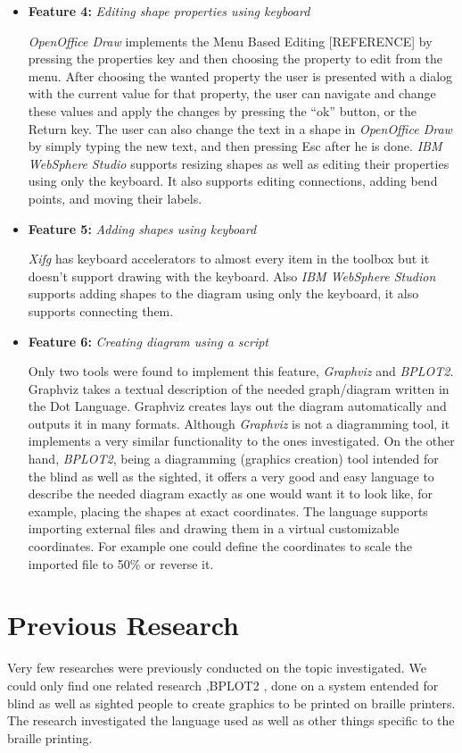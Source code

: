 \begin{itemize}
\item {\bf Feature 4:} {\em Editing shape properties using keyboard}
\par \noindent
{\em OpenOffice Draw} implements the Menu Based Editing [REFERENCE] by pressing the properties key and then choosing the property to edit from the menu. After choosing the wanted property the user is presented with a dialog with the current value for that property, the user can navigate and change these values and apply the changes by pressing the ``ok'' button, or the Return key. The user can also change the text in a shape in {\em OpenOffice Draw} by simply typing the new text, and then pressing Esc after he is done. {\em IBM WebSphere Studio} supports resizing shapes as well as editing their properties using only the keyboard. It also supports editing connections, adding bend points, and moving their labels.


\item {\bf Feature 5:} {\em Adding shapes using keyboard}
\par \noindent
{\em Xifg} has keyboard accelerators to almost every item in the toolbox but it doesn't support drawing with the keyboard. Also {\em IBM WebSphere Studion} supports adding shapes to the diagram using only the keyboard, it also supports connecting them.

\item {\bf Feature 6:} {\em Creating diagram using a script}
\par \noindent
Only two tools were found to implement this feature, {\em Graphviz} and {\em BPLOT2}. Graphviz takes a textual description of the needed graph/diagram written in the Dot Language\cite{dot_lang}. Graphviz creates lays out the diagram automatically and outputs it in many formats. Although {\em Graphviz} is not a diagramming tool, it implements a very similar functionality to the ones investigated. On the other hand, {\em BPLOT2}, being a diagramming (graphics creation) tool intended for the blind as well as the sighted, it offers a very good and easy language to describe the needed diagram exactly as one would want it to look like, for example, placing the shapes at exact coordinates. The language supports importing external files and drawing them in a virtual customizable coordinates. For example one could define the coordinates to scale the imported file to 50\% or reverse it.

\end{itemize}


\section{Previous Research}
Very few researches were previously conducted on the topic investigated. We could only find one related research ,BPLOT2 \cite{bplot2}, done on a system entended for blind as well as sighted people to create graphics to be printed on braille printers. The research investigated the language used as well as other things specific to the braille printing.